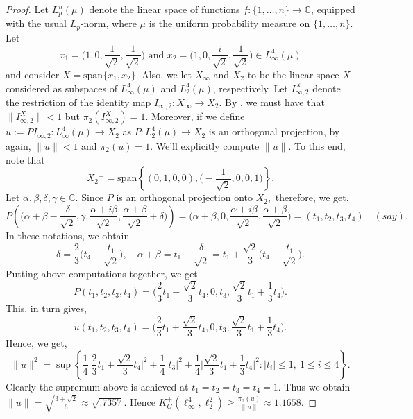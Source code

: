 \documentclass[a4paper,oneside,11pt, reqno]{amsart}
\numberwithin{equation}{section}
\theoremstyle{plain}
\begin{document}
\begin{proof}
Let \( L_p^n(\mu) \) denote the linear space of functions \( f: \{1, \dots, n\} \to \mathbb{C} \), equipped with the usual \( L_p \)-norm, where \( \mu \) is the uniform probability measure on \( \{1, \dots, n\} \).
Let 
\[x_1=\Big(1,0,\frac{1}{\sqrt{2}},\frac{1}{\sqrt{2}}\Big) \text{~and~} x_2=\Big(1,0,\frac{i}{\sqrt{2}},\frac{1}{\sqrt{2}}\Big)\in L_\infty^4(\mu)\] and consider $X=\text{span}\{x_1,x_2\}.$ Also, we let  $X_\infty$ and $X_2$ to be the linear space $X$ considered as subspaces of $L_\infty^4(\mu)$ and $L_2^4(\mu)$, respectively. 
Let $I_{\infty,2}^X$ denote the restriction of the identity map $I_{\infty,2}:X_\infty\to X_2.$ By \cite[Example 2.3]{AFHS95}, we must have that $\|I_{\infty,2}^X\|<1$ but $\pi_2(I_{\infty,2}^X)=1.$ Moreover, if we define $u:=PI_{\infty,2}:L_\infty^4(\mu)\to X_2$ as $P:L_2^4(\mu)\to X_2$ is an orthogonal projection, by \cite{AFHS95} again, $\|u\|<1$ and $\pi_2(u)=1.$ We'll explicitly compute $\|u\|.$ To this end, note that $${X_2}^{\perp}=\text{span}\left\{(0,1,0,0),\big(-\frac{1}{\sqrt{2}},0,0,1\big)\right\}.$$ 
Let $\alpha,\beta,\delta,\gamma\in\mathbb{C}.$ Since $P$ is an orthogonal projection onto $X_2,$ therefore, 
we get, 
$$P\left(\Big(\alpha+\beta-\frac{\delta}{\sqrt{2}},\gamma,\frac{\alpha+i\beta}{\sqrt{2}},\frac{\alpha+\beta}{\sqrt{2}}+\delta\Big)\right)=\Big(\alpha+\beta,0,\frac{\alpha+i\beta}{\sqrt{2}},\frac{\alpha+\beta}{\sqrt{2}}\Big)=(t_1,t_2,t_3,t_4) \quad (say).$$ 
 In these notations, we obtain $$\delta=\frac{2}{3}\Big(t_4-\frac{t_1}{\sqrt{2}}\Big), \quad \alpha+\beta=t_1+\frac{\delta}{\sqrt{2}}=t_1+\frac{\sqrt{2}}{3}\Big(t_4-\frac{t_1}{\sqrt{2}}\Big).$$  
 Putting above computations together, we get 
\[P(t_1,t_2,t_3,t_4)=\Big(\frac{2}{3}t_1+\frac{\sqrt{2}}{3}t_4,0,t_3,\frac{\sqrt{2}}{3}t_1+\frac{1}{3}t_4\Big).\] This, in turn gives, 
\[u(t_1,t_2,t_3,t_4)=\Big(\frac{2}{3}t_1+\frac{\sqrt{2}}{3}t_4,0,t_3,\frac{\sqrt{2}}{3}t_1+\frac{1}{3}t_4\Big).\] Hence, we get, 
\[\|u\|^2=\sup\left\{\frac{1}{4}\Big|\frac{2}{3}t_1+\frac{\sqrt{2}}{3}t_4\Big|^2+\frac{1}{4}|t_3|^2+\frac{1}{4}\Big|\frac{\sqrt{2}}{3}t_1+\frac{1}{3}t_4\Big|^2:|t_i|\leqslant 1,\ 1\leqslant i\leqslant 4\right\}.\] 
Clearly  the supremum above  is achieved at $t_1=t_2=t_3=t_4=1$. Thus we obtain $\|u\|= \sqrt{\frac{3+\sqrt{2}}{6}}\approx\sqrt{.7357}.$ Hence $K_G^{+}(\ell_\infty^4,\ell_2^2)\geqslant \frac{\pi_2(u)}{\|u\|}\approx 1.1658.$
\end{proof}
\end{document}
